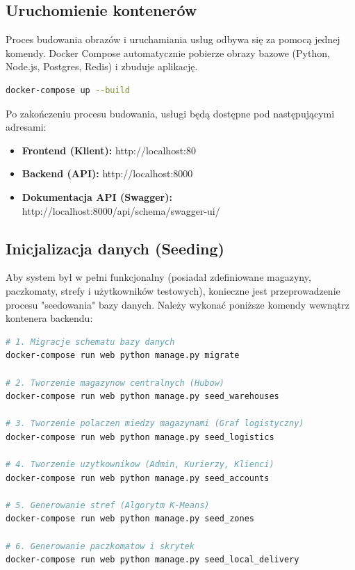 \subsection{Uruchomienie kontenerów}

Proces budowania obrazów i uruchamiania usług odbywa się za pomocą jednej komendy. Docker Compose automatycznie pobierze obrazy bazowe (Python, Node.js, Postgres, Redis) i zbuduje aplikację.

\begin{lstlisting}[language=bash, caption=Komenda uruchamiająca środowisko]
docker-compose up --build
\end{lstlisting}

Po zakończeniu procesu budowania, usługi będą dostępne pod następującymi adresami:
\begin{itemize}
    \item \textbf{Frontend (Klient):} http://localhost:80
    \item \textbf{Backend (API):} http://localhost:8000
    \item \textbf{Dokumentacja API (Swagger):} http://localhost:8000/api/schema/swagger-ui/
\end{itemize}

\subsection{Inicjalizacja danych (Seeding)}

Aby system był w pełni funkcjonalny (posiadał zdefiniowane magazyny, paczkomaty, strefy i użytkowników testowych), konieczne jest przeprowadzenie procesu "seedowania" bazy danych. Należy wykonać poniższe komendy wewnątrz kontenera backendu:

\begin{lstlisting}[language=bash, caption=Skrypty inicjalizujące dane testowe]
# 1. Migracje schematu bazy danych
docker-compose run web python manage.py migrate

# 2. Tworzenie magazynow centralnych (Hubow)
docker-compose run web python manage.py seed_warehouses

# 3. Tworzenie polaczen miedzy magazynami (Graf logistyczny)
docker-compose run web python manage.py seed_logistics

# 4. Tworzenie uzytkownikow (Admin, Kurierzy, Klienci)
docker-compose run web python manage.py seed_accounts

# 5. Generowanie stref (Algorytm K-Means)
docker-compose run web python manage.py seed_zones

# 6. Generowanie paczkomatow i skrytek
docker-compose run web python manage.py seed_local_delivery
\end{lstlisting}

